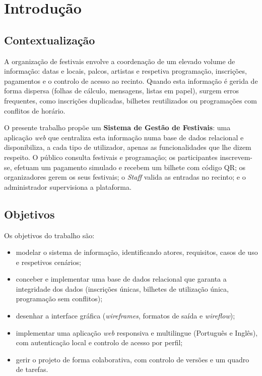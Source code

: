 \chapter{Introdução}

\section{Contextualização}

A organização de festivais envolve a coordenação de um elevado volume de
informação: datas e locais, palcos, artistas e respetiva programação,
inscrições, pagamentos e o controlo de acesso ao recinto. Quando esta
informação é gerida de forma dispersa (folhas de cálculo, mensagens, listas em
papel), surgem erros frequentes, como inscrições duplicadas, bilhetes
reutilizados ou programações com conflitos de horário.

O presente trabalho propõe um \textbf{Sistema de Gestão de Festivais}: uma
aplicação \emph{web} que centraliza esta informação numa base de dados
relacional e disponibiliza, a cada tipo de utilizador, apenas as
funcionalidades que lhe dizem respeito. O público consulta festivais e
programação; os participantes inscrevem-se, efetuam um pagamento simulado e
recebem um bilhete com código QR; os organizadores gerem os seus festivais; o
\emph{Staff} valida as entradas no recinto; e o administrador supervisiona a
plataforma.

\section{Objetivos}

Os objetivos do trabalho são:
\begin{itemize}
  \item modelar o sistema de informação, identificando atores, requisitos,
        casos de uso e respetivos cenários;
  \item conceber e implementar uma base de dados relacional que garanta a
        integridade dos dados (inscrições únicas, bilhetes de utilização
        única, programação sem conflitos);
  \item desenhar a interface gráfica (\emph{wireframes}, formatos de saída e
        \emph{wireflow});
  \item implementar uma aplicação \emph{web} responsiva e multilingue
        (Português e Inglês), com autenticação local e controlo de acesso por
        perfil;
  \item gerir o projeto de forma colaborativa, com controlo de versões e um
        quadro de tarefas.
\end{itemize}

